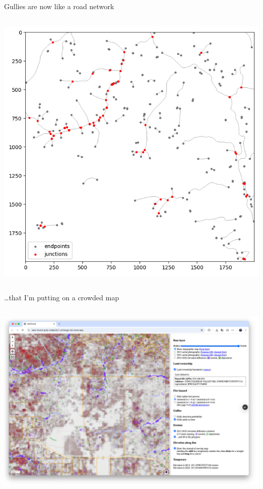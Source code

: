 \documentclass[aspectratio=169]{beamer}
\begin{document}
\begin{frame}{Gullies are now like a road network}
\vspace{0.15 cm}
\begin{columns}
\includegraphics[width=\linewidth]{img/skeletonized-graph.png}
\end{columns}
\end{frame}

\begin{frame}{\ldots that I'm putting on a crowded map}
\vspace{0.15 cm}
\begin{columns}
\includegraphics[width=\linewidth]{img/crowded-map.png}
\end{columns}
\end{frame}
\end{document}
